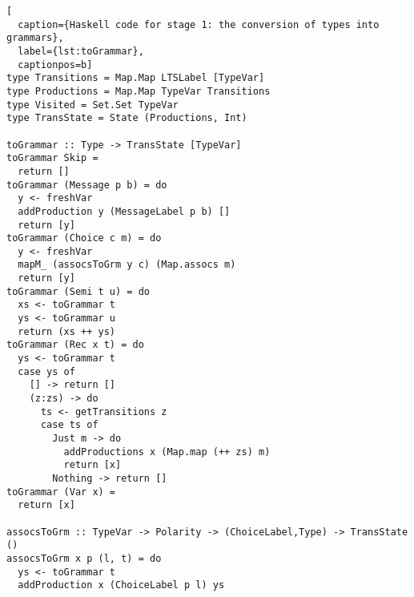 \begin{lstlisting}[
  caption={Haskell code for stage 1: the conversion of types into grammars},
  label={lst:toGrammar},
  captionpos=b]
type Transitions = Map.Map LTSLabel [TypeVar]
type Productions = Map.Map TypeVar Transitions
type Visited = Set.Set TypeVar
type TransState = State (Productions, Int)

toGrammar :: Type -> TransState [TypeVar]
toGrammar Skip =
  return []
toGrammar (Message p b) = do
  y <- freshVar
  addProduction y (MessageLabel p b) []
  return [y]
toGrammar (Choice c m) = do
  y <- freshVar
  mapM_ (assocsToGrm y c) (Map.assocs m)
  return [y]
toGrammar (Semi t u) = do
  xs <- toGrammar t
  ys <- toGrammar u
  return (xs ++ ys)
toGrammar (Rec x t) = do
  ys <- toGrammar t
  case ys of
    [] -> return []
    (z:zs) -> do
      ts <- getTransitions z
      case ts of
        Just m -> do
          addProductions x (Map.map (++ zs) m)
          return [x]
        Nothing -> return []
toGrammar (Var x) =
  return [x]

assocsToGrm :: TypeVar -> Polarity -> (ChoiceLabel,Type) -> TransState ()
assocsToGrm x p (l, t) = do
  ys <- toGrammar t
  addProduction x (ChoiceLabel p l) ys
\end{lstlisting}


